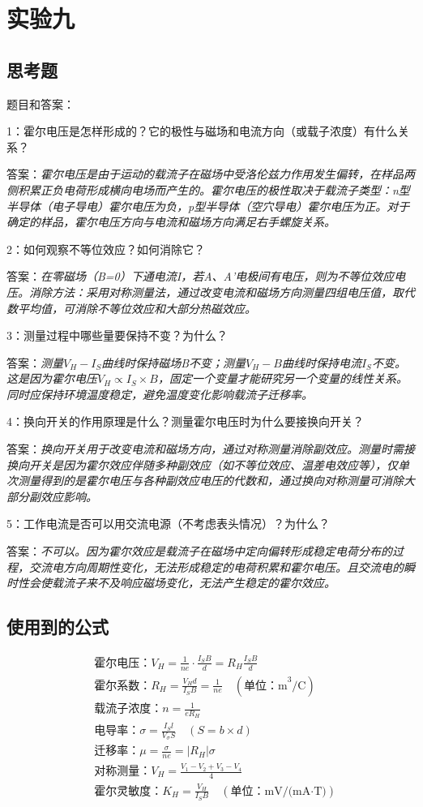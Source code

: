 \documentclass[10pt,journal,compsoc]{IEEEtran}
\begin{document}
\section{实验九}
\subsection{思考题}
题目和答案：

1：霍尔电压是怎样形成的？它的极性与磁场和电流方向（或载子浓度）有什么关系？

答案：\textit{霍尔电压是由于运动的载流子在磁场中受洛伦兹力作用发生偏转，在样品两侧积累正负电荷形成横向电场而产生的。霍尔电压的极性取决于载流子类型：n型半导体（电子导电）霍尔电压为负，p型半导体（空穴导电）霍尔电压为正。对于确定的样品，霍尔电压方向与电流和磁场方向满足右手螺旋关系。}

2：如何观察不等位效应？如何消除它？

答案：\textit{在零磁场（B=0）下通电流I，若A、A'电极间有电压，则为不等位效应电压。消除方法：采用对称测量法，通过改变电流和磁场方向测量四组电压值，取代数平均值，可消除不等位效应和大部分热磁效应。}

3：测量过程中哪些量要保持不变？为什么？

答案：\textit{测量$V_H-I_S$曲线时保持磁场B不变；测量$V_H-B$曲线时保持电流$I_S$不变。这是因为霍尔电压$V_H∝I_S×B$，固定一个变量才能研究另一个变量的线性关系。同时应保持环境温度稳定，避免温度变化影响载流子迁移率。}

4：换向开关的作用原理是什么？测量霍尔电压时为什么要接换向开关？

答案：\textit{换向开关用于改变电流和磁场方向，通过对称测量消除副效应。测量时需接换向开关是因为霍尔效应伴随多种副效应（如不等位效应、温差电效应等），仅单次测量得到的是霍尔电压与各种副效应电压的代数和，通过换向对称测量可消除大部分副效应影响。}

5：工作电流是否可以用交流电源（不考虑表头情况）？为什么？

答案：\textit{不可以。因为霍尔效应是载流子在磁场中定向偏转形成稳定电荷分布的过程，交流电方向周期性变化，无法形成稳定的电荷积累和霍尔电压。且交流电的瞬时性会使载流子来不及响应磁场变化，无法产生稳定的霍尔效应。}

\subsection{使用到的公式}
\begin{align*}
&\text{霍尔电压：}V_H = \frac{1}{ne} \cdot \frac{I_S B}{d} = R_H \frac{I_S B}{d} \\
&\text{霍尔系数：}R_H = \frac{V_H d}{I_S B} = \frac{1}{ne} \quad (\text{单位：m}^3/\text{C}) \\
&\text{载流子浓度：}n = \frac{1}{e R_H} \\
&\text{电导率：}\sigma = \frac{I_S l}{V_\sigma S} \quad (S = b \times d) \\
&\text{迁移率：}\mu = \frac{\sigma}{ne} = |R_H| \sigma \\
&\text{对称测量：}V_H = \frac{V_1 - V_2 + V_3 - V_4}{4} \\
&\text{霍尔灵敏度：}K_H = \frac{V_H}{I_S B} \quad (\text{单位：mV/(mA·T)})
\end{align*}
\end{document}
